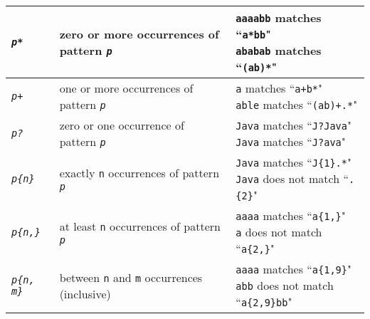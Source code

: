 \documentclass[11pt]{article}
\begin{document}
\begin{itemize}
\begin{tabular}{l l l}
			\hline
			\texttt{\emph{p*}} & zero or more occurrences of pattern \texttt{\emph{p}} & \makecell[cc]{\texttt{aaaabb} matches ``\texttt{a*bb}" \\ \texttt{ababab} matches ``\texttt{(ab)*}"}\\
			\hline
			\texttt{\emph{p+}} & one or more occurrences of pattern \texttt{\emph{p}} & \makecell[cc]{\texttt{a} matches ``\texttt{a+b*}" \\ \texttt{able} matches ``\texttt{(ab)+.*}"}\\
			\hline
			\texttt{\emph{p?}} & zero or one occurrence of pattern \texttt{\emph{p}} & \makecell[cc]{\texttt{Java} matches ``\texttt{J?Java}" \\ \texttt{Java} matches ``\texttt{J?ava}"}\\
			\hline
			\texttt{\emph{p\{n\}}} & exactly \texttt{n} occurrences of pattern \texttt{\emph{p}} & \makecell[cc]{\texttt{Java} matches ``\texttt{J\{1\}.*}" \\ \texttt{Java} does not match ``\texttt{.\{2\}}"}\\
			\hline
			\texttt{\emph{p\{n,\}}} & at least \texttt{n} occurrences of pattern \texttt{\emph{p}} & \makecell[cc]{\texttt{aaaa} matches ``\texttt{a\{1,\}}" \\ \texttt{a} does not match ``\texttt{a\{2,\}}"}\\
			\hline
			\texttt{\emph{p\{n, m\}}} & between \texttt{n} and \texttt{m} occurrences (inclusive) & \makecell[cc]{\texttt{aaaa} matches ``\texttt{a\{1,9\}}" \\ \texttt{abb} does not match ``\texttt{a\{2,9\}bb}"}\\
		\end{tabular}

\end{itemize}
\end{document}
